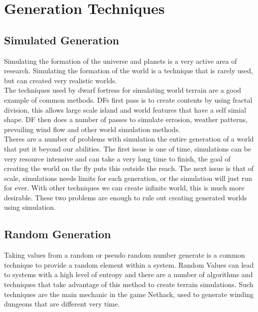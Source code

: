 \newpage

\section{Generation Techniques}

\subsection{Simulated Generation}
Simulating the formation of the universe and planets is a very active area of 
research. Simulating the formation of the world is a technique that is rarely
used, but can created very realistic worlds.\\

The techniques used by dwarf fortress for simulating world terrain are a good
example of common methods. DFs first pass is to create contents by using fractal
division, this allows large scale island and world features that have a self 
simial shape. DF then does a number of passes to simulate errosion, weather 
patterns, prevailing wind flow and other world simulation methods.\\

Theres are a number of problems with
simulation the entire generation of a world that put it beyond our abilities. 
The first issue is one of time, simulations can be very resource intensive and 
can take a very long time to finish, the goal of creating the world on the fly 
puts this outside the reach. The next issue is that of scale, simulations needs
limits for each generation, or the simulation will just run for ever. With other
techniques we can create infinite world, this is much more desirable. These two
problems are enough to rule out creating generated worlds using simulation.\\

\subsection{Random Generation}
Taking values from a random or pseudo random number generate is a common 
technique to provide a random element within a system. Random Values can lead to
systems with a high level of entropy and there are a number of algorithms and 
techniques that take advantage of this method to create terrain simulations. Such
techniques are the main mechanic in the game Nethack, used to generate winding
dungeons that are different very time.\\

